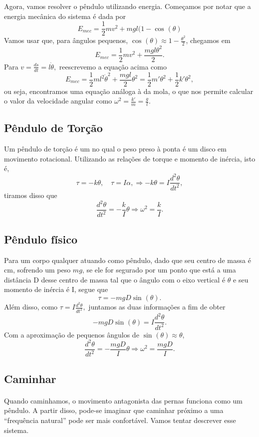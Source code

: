 \documentclass{article}
\begin{document}
  Agora, vamos resolver o pêndulo utilizando energia. Começamos por notar que a energia mecânica do sistema é dada por 
    \[
      E_{mec} = \frac{1}{2}mv^{2} + mgl(1-\cos^{}{(\theta )}
    \]
  Vamos usar que, para ângulos pequenos, \(\cos^{}{(\theta )}\approx 1-\frac{\theta ^{2}}{2} \), chegamos em
   \[
      E_{mec} = \frac{1}{2}mv^{2}+\frac{mgl\theta ^{2}}{2}.  
   \]
   Para \(v=\frac{ds}{dt} = l\dot \theta ,\) reescrevemo a equação acima como 
     \[
       E_{mec} = \frac{1}{2}ml^{2}\dot\theta ^{2} + \frac{mgl}{2}\theta^{2} = \frac{1}{2}m'\theta ^{2} + \frac{1}{2}k'\theta ^{2},
     \]
  ou seja, encontramos uma equação análoga à da mola, o que nos permite calcular o valor da velocidade angular como \(\omega^{2}=\frac{k'}{m} = \frac{g}{l}.\)
\subsection{Pêndulo de Torção}
  Um pêndulo de torção é um no qual o peso preso à ponta é um disco em movimento rotacional. Utilizando as relações de torque e momento de inércia, isto é, 
    \[
      \tau = -k\theta, \quad \tau = I\alpha, \Rightarrow -k\theta = I \frac{d^{2}\theta }{dt^{2}},
    \]
  tiramos disso que 
    \[
      \frac{d^{2}\theta }{dt^{2}} = - \frac{k}{I}\theta \Rightarrow \omega^{2} = \frac{k}{I}.
    \]
\subsection{Pêndulo físico}
  Para um corpo qualquer atuando como pêndulo, dado que seu centro de massa é cm, sofrendo um peso \(mg\), se ele for segurado por um ponto que está a uma distância
D desse centro de massa tal que o ângulo com o eixo vertical é \(\theta \) e seu momento de inércia é I, segue que 
  \[
    \tau  = -mgD\sin^{}{(\theta )}.
  \]
  Além disso, como \(\tau = I \frac{d^{2}\theta }{dt^{2}},\) juntamos as duas informações a fim de obter 
    \[
      -mgD\sin^{}{(\theta )} = I \frac{d^{2}\theta }{dt^{2}}.
    \]
  Com a aproximação de pequenos ângulos de \(\sin^{}{(\theta )}\approx \theta \), 
    \[
      \frac{d^{2}\theta }{dt^{2}} = -\frac{mgD}{I}\theta \Rightarrow \omega^{2}= \frac{mgD}{I}.
    \]
\subsection{Caminhar}
\paragraph{} Quando caminhamos, o movimento antagonista das pernas funciona como um pêndulo. A partir disso, pode-se imaginar que caminhar próximo
a uma ``frequência natural'' pode ser mais confortável. Vamos tentar descrever esse sistema.
\end{document}
